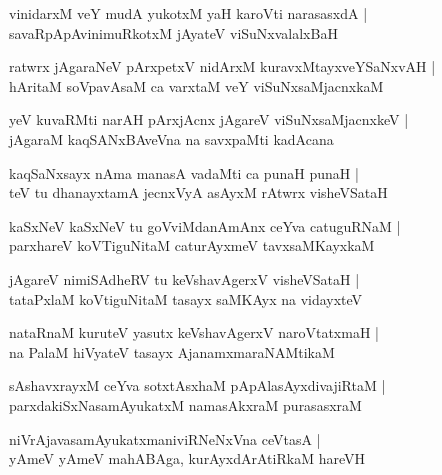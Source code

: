 \documentclass[twoside,12pt,openright]{book}
\newcounter{shloka}[chapter]
\begin{document}
\begin{shloka}%
vinidarxM veY mudA yukotxM yaH karoVti narasasxdA |\\
savaRpApAvinimuRkotxM jAyateV viSuNxvalalxBaH 
\end{shloka}

\begin{shloka}%
ratwrx jAgaraNeV pArxpetxV nidArxM kuravxMtayxveYSaNxvAH |\\
hAritaM soVpavAsaM ca varxtaM veY viSuNxsaMjacnxkaM 
\end{shloka}

\begin{shloka}%
yeV kuvaRMti narAH pArxjAcnx jAgareV viSuNxsaMjacnxkeV |\\
jAgaraM kaqSANxBAveVna na savxpaMti kadAcana
\end{shloka}

\begin{shloka}%
kaqSaNxsayx nAma manasA vadaMti ca punaH punaH |\\
teV tu dhanayxtamA jecnxVyA asAyxM rAtwrx visheVSataH
\end{shloka}

\begin{shloka}%
kaSxNeV kaSxNeV tu goVviMdanAmAnx ceYva catuguRNaM |\\
parxhareV koVTiguNitaM caturAyxmeV tavxsaMKayxkaM 
\end{shloka}

\begin{shloka}%
jAgareV nimiSAdheRV tu keVshavAgerxV visheVSataH |\\
tataPxlaM koVtiguNitaM tasayx saMKAyx na vidayxteV 
\end{shloka}

\begin{shloka}%
nataRnaM kuruteV yasutx keVshavAgerxV naroVtatxmaH |\\
na PalaM hiVyateV tasayx AjanamxmaraNAMtikaM 
\end{shloka}

\begin{shloka}%
sAshavxrayxM ceYva sotxtAsxhaM pApAlasAyxdivajiRtaM |\\
parxdakiSxNasamAyukatxM namasAkxraM purasasxraM 
\end{shloka}

\begin{shloka}%
niVrAjavasamAyukatxmaniviRNeNxVna ceVtasA |\\
yAmeV yAmeV mahABAga, kurAyxdArAtiRkaM hareVH 
\end{shloka}
\end{document}
